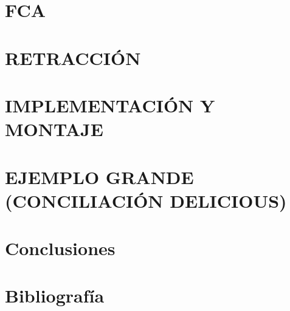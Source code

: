 \documentclass[a4paper,11pt,final]{book}
\begin{document}
 




\newpage
{}
\pagestyle{fancy} 
\tableofcontents







\part{FCA}


\part{RETRACCIÓN}


\part{IMPLEMENTACIÓN Y MONTAJE}


\part{EJEMPLO GRANDE (CONCILIACIÓN DELICIOUS) }

\part{Conclusiones}
 			




\newpage
\part{Bibliografía}


\end{document}
